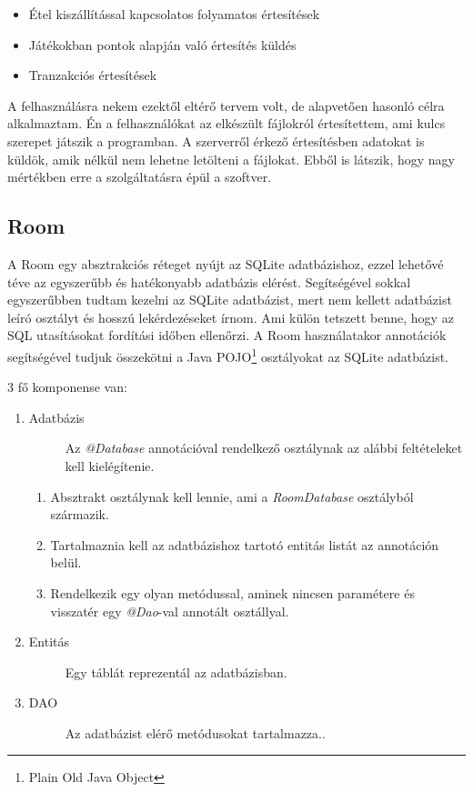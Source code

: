 \documentclass{thesis-ekf}
\theoremstyle{definition}
\theoremstyle{remark}
\begin{document}
\begin{itemize}
	\item Étel kiszállítással kapcsolatos folyamatos értesítések
	\item Játékokban pontok alapján való értesítés küldés
	\item Tranzakciós értesítések
\end{itemize}

A felhasználásra nekem ezektől eltérő tervem volt, de alapvetően hasonló célra alkalmaztam.
Én a felhasználókat az elkészült fájlokról értesítettem, ami kulcs szerepet játszik a programban.
A szerverről érkező értesítésben adatokat is küldök, amik nélkül nem lehetne letölteni a fájlokat.
Ebből is látszik, hogy nagy mértékben erre a szolgáltatásra épül a szoftver.

\subsection{Room}

A Room egy absztrakciós réteget nyújt az SQLite adatbázishoz, ezzel lehetővé téve az egyszerűbb és hatékonyabb adatbázis elérést.
Segítségével sokkal egyszerűbben tudtam kezelni az SQLite adatbázist, mert nem kellett adatbázist leíró osztályt és hosszú lekérdezéseket írnom.
Ami külön tetszett benne, hogy az SQL utasításokat fordítási időben ellenőrzi. 
A Room használatakor annotációk segítségével tudjuk összekötni a Java POJO\footnote{Plain Old Java Object} osztályokat az SQLite adatbázist.

3 fő komponense van:

\begin{enumerate}
	\item
	\begin{description}
		\item[Adatbázis] Az \emph{@Database} annotációval rendelkező osztálynak az alábbi feltételeket kell kielégítenie.
	\end{description}
	\begin{enumerate}
		\item Absztrakt osztálynak kell lennie, ami a \emph{RoomDatabase} osztályból származik.
		\item Tartalmaznia kell az adatbázishoz tartotó entitás listát az annotáción belül.
		\item Rendelkezik egy olyan metódussal, aminek nincsen paramétere és visszatér egy \emph{@Dao}-val annotált osztállyal.
	\end{enumerate}
	\item
	\begin{description}
		\item[Entitás] Egy táblát reprezentál az adatbázisban.
	\end{description}
	\item
	\begin{description}
		\item[DAO] Az adatbázist elérő metódusokat tartalmazza..
	\end{description}
\end{enumerate}
\end{document}
